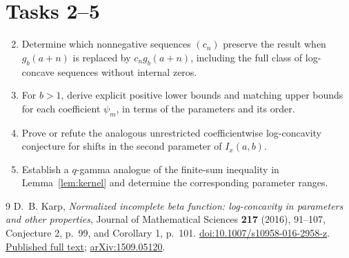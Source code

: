 \documentclass[11pt]{article}
\begin{document}
\section*{Tasks 2--5}

\begin{enumerate}
\setcounter{enumi}{1}
\item Determine which nonnegative sequences $(c_n)$ preserve the result
when $g_b(a+n)$ is replaced by $c_n g_b(a+n)$, including the full class
of log-concave sequences without internal zeros.
\item For $b>1$, derive explicit positive lower bounds and matching upper
bounds for each coefficient $\psi_m$, in terms of the parameters and its order.
\item Prove or refute the analogous unrestricted coefficientwise
log-concavity conjecture for shifts in the second parameter of $I_x(a,b)$.
\item Establish a \(q\)-gamma analogue of the finite-sum inequality
in Lemma~\ref{lem:kernel} and determine the corresponding parameter ranges.
\end{enumerate}

\begin{thebibliography}{9}
D.~B. Karp, \emph{Normalized incomplete beta function:
log-concavity in parameters and other properties},
Journal of Mathematical Sciences \textbf{217} (2016), 91--107,
Conjecture 2, p.~99, and Corollary 1, p.~101.
\href{https://doi.org/10.1007/s10958-016-2958-z}
{doi:10.1007/s10958-016-2958-z}.
\href{https://dmkrp.wordpress.com/wp-content/uploads/2016/07/karp2016.pdf}
{Published full text};
\href{https://arxiv.org/abs/1509.05120}{arXiv:1509.05120}.
\end{thebibliography}
\end{document}
